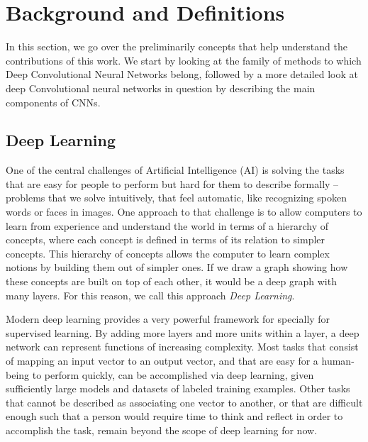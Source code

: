 \chapter{Background and Definitions}
\label{sec:Background}
In this section, we go over the preliminarily concepts that help understand the contributions of this work. We start by looking at the family of methods to which Deep Convolutional Neural Networks belong, followed by a more detailed look at deep Convolutional neural networks in question by describing the main components of CNNs. 

\section{Deep Learning}
\label{sec:dl}
One of the central challenges of Artificial Intelligence (AI) is solving the tasks that are easy for people to perform but hard for them to describe formally -- problems that we solve intuitively, that feel automatic, like recognizing spoken words or faces in images. One approach to that challenge is to allow computers to learn from experience and understand the world in terms of a hierarchy of concepts, where each concept is defined in terms of its relation to simpler concepts. This hierarchy of concepts allows the computer to learn complex notions by building them out of simpler ones. If we draw a graph showing how these concepts are built on top of each other, it would be a deep graph with many layers. For this reason, we call this approach \textit{Deep Learning}\cite{Goodfellow-et-al-2016-Book}.

Modern deep learning provides a very powerful framework for specially for supervised learning. By adding more layers and more units within a layer, a deep network can represent functions of increasing complexity. Most tasks that consist of mapping an input vector to an output vector, and that are easy for a human-being to perform quickly, can be accomplished via deep learning, given sufficiently large models and datasets of labeled training examples. Other tasks that cannot be described as associating one vector to another, or that are difficult enough such that a person would require time to think and reflect in order to accomplish the task, remain beyond the scope of deep learning for now\cite{Goodfellow-et-al-2016-Book}.

